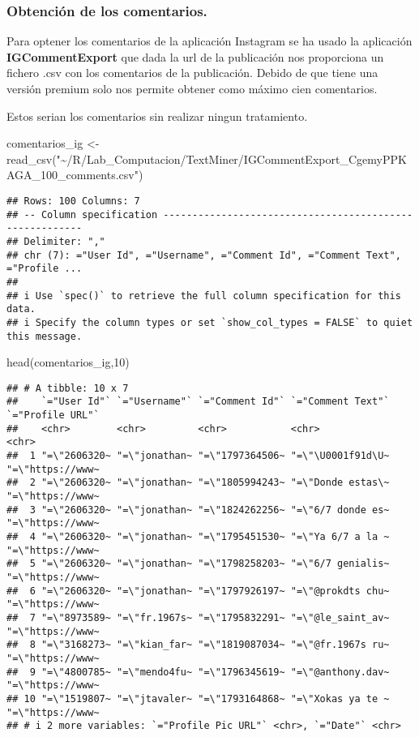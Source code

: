 \documentclass[
]{article}
\newenvironment{Shaded}{\begin{snugshade}}{\end{snugshade}}
\newcommand{\DecValTok}[1]{\textcolor[rgb]{0.00,0.00,0.81}{#1}}
\newcommand{\FunctionTok}[1]{\textcolor[rgb]{0.00,0.00,0.00}{#1}}
\newcommand{\NormalTok}[1]{#1}
\newcommand{\OtherTok}[1]{\textcolor[rgb]{0.56,0.35,0.01}{#1}}
\newcommand{\StringTok}[1]{\textcolor[rgb]{0.31,0.60,0.02}{#1}}
\begin{document}
\hypertarget{obtenciuxf3n-de-los-comentarios.}{%
\subsubsection{Obtención de los
comentarios.}\label{obtenciuxf3n-de-los-comentarios.}}

Para optener los comentarios de la aplicación Instagram se ha usado la
aplicación \textbf{IGCommentExport} que dada la url de la publicación
nos proporciona un fichero .csv con los comentarios de la publicación.
Debido de que tiene una versión premium solo nos permite obtener como
máximo cien comentarios.

Estos serian los comentarios sin realizar ningun tratamiento.

\begin{Shaded}
\begin{Highlighting}[]
\NormalTok{comentarios\_ig }\OtherTok{\textless{}{-}} \FunctionTok{read\_csv}\NormalTok{(}\StringTok{"\textasciitilde{}/R/Lab\_Computacion/TextMiner/IGCommentExport\_CgemyPPKAGA\_100\_comments.csv"}\NormalTok{)}
\end{Highlighting}
\end{Shaded}

\begin{verbatim}
## Rows: 100 Columns: 7
## -- Column specification --------------------------------------------------------
## Delimiter: ","
## chr (7): ="User Id", ="Username", ="Comment Id", ="Comment Text", ="Profile ...
## 
## i Use `spec()` to retrieve the full column specification for this data.
## i Specify the column types or set `show_col_types = FALSE` to quiet this message.
\end{verbatim}

\begin{Shaded}
\begin{Highlighting}[]
\FunctionTok{head}\NormalTok{(comentarios\_ig,}\DecValTok{10}\NormalTok{)}
\end{Highlighting}
\end{Shaded}

\begin{verbatim}
## # A tibble: 10 x 7
##    `="User Id"` `="Username"` `="Comment Id"` `="Comment Text"` `="Profile URL"`
##    <chr>        <chr>         <chr>           <chr>             <chr>           
##  1 "=\"2606320~ "=\"jonathan~ "=\"1797364506~ "=\"\U0001f91d\U~ "=\"https://www~
##  2 "=\"2606320~ "=\"jonathan~ "=\"1805994243~ "=\"Donde estas\~ "=\"https://www~
##  3 "=\"2606320~ "=\"jonathan~ "=\"1824262256~ "=\"6/7 donde es~ "=\"https://www~
##  4 "=\"2606320~ "=\"jonathan~ "=\"1795451530~ "=\"Ya 6/7 a la ~ "=\"https://www~
##  5 "=\"2606320~ "=\"jonathan~ "=\"1798258203~ "=\"6/7 genialis~ "=\"https://www~
##  6 "=\"2606320~ "=\"jonathan~ "=\"1797926197~ "=\"@prokdts chu~ "=\"https://www~
##  7 "=\"8973589~ "=\"fr.1967s~ "=\"1795832291~ "=\"@le_saint_av~ "=\"https://www~
##  8 "=\"3168273~ "=\"kian_far~ "=\"1819087034~ "=\"@fr.1967s ru~ "=\"https://www~
##  9 "=\"4800785~ "=\"mendo4fu~ "=\"1796345619~ "=\"@anthony.dav~ "=\"https://www~
## 10 "=\"1519807~ "=\"jtavaler~ "=\"1793164868~ "=\"Xokas ya te ~ "=\"https://www~
## # i 2 more variables: `="Profile Pic URL"` <chr>, `="Date"` <chr>
\end{verbatim}
\end{document}

